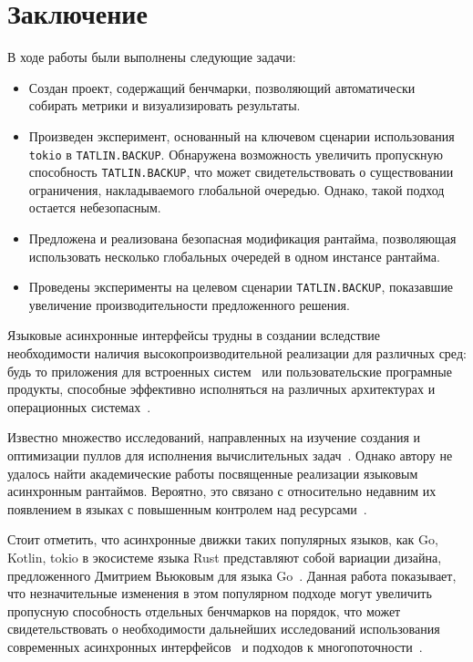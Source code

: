 
\section{Заключение}

В ходе работы были выполнены следующие задачи:

\begin{itemize}
    \item Создан проект, содержащий бенчмарки, позволяющий автоматически собирать метрики и визуализировать результаты.
    \item Произведен эксперимент, основанный на ключевом сценарии использования \verb|tokio| в \verb|TATLIN.BACKUP|. Обнаружена возможность увеличить пропускную способность \verb|TATLIN.BACKUP|, что может свидетельствовать о существовании ограничения, накладываемого глобальной очередью. Однако, такой подход остается небезопасным.
    \item Предложена и реализована безопасная модификация рантайма, позволяющая использовать несколько глобальных очередей в одном инстансе рантайма.
    \item Проведены эксперименты на целевом сценарии \verb|TATLIN.BACKUP|, показавшие увеличение производительности предложенного решения.
\end{itemize}

Языковые асинхронные интерфейсы трудны в создании вследствие необходимости наличия высокопроизводительной реализации для различных сред: будь то приложения для встроенных систем~\cite{CPPCoroutinesOnMicrocontrollers, AsyncIOT} или пользовательские програмные продукты, способные эффективно исполняться на различных архитектурах и операционных системах~\cite{CPPCoroutinesDesignAndImpl}.

Известно множество исследований, направленных на изучение создания и оптимизации пуллов для исполнения вычислительных задач~\cite{ThreadPoolSize, PerfDeviationsInThreadPools, SyncInThreadPools, ProduserConsumerThreadPool}. Однако автору не удалось найти академические работы посвященные реализации языковым асинхронным рантаймов. Вероятно, это связано с относительно недавним их появлением в языках с повышенным контролем над ресурсами~\cite{CPPCoroutinesDesignAndImpl}.

Стоит отметить, что асинхронные движки таких популярных языков, как Go, Kotlin, tokio в экосистеме языка Rust представляют собой вариации дизайна, предложенного Дмитрием Вьюковым для языка Go~\cite{GoScheduler, GoSchedulerImpropvements}. Данная работа показывает, что незначительные изменения в этом популярном подходе могут увеличить пропусную способность отдельных бенчмарков на порядок, что может свидетельствовать о необходимости дальнейших исследований использования современных асинхронных интерфейсов~\cite{ModernStorageAPI} и подходов к многопоточности~\cite{ThreadPerCore}.
